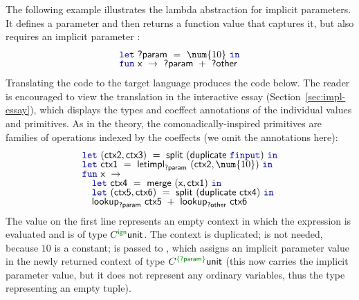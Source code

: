 The following example illustrates the lambda abstraction for implicit parameters.
It defines a parameter  and then returns a function value that captures it, but
also requires an implicit parameter :
%
\begin{equation*}
\begin{array}{l}
\kvd{let}~\ident{?param} ~=~ \num{10}~\kvd{in}\\[-0.25em]
\kvd{fun}~\ident{x}~\rightarrow~\ident{?param} ~+~ \ident{?other}
\end{array}
\end{equation*}
%
Translating the code to the target language produces the code below. The reader is encouraged to
view the translation in the interactive essay (Section~\ref{sec:impl-essay}), which displays the
types and coeffect annotations of the individual values and primitives. As in the theory, the
comonadically-inspired primitives are families of operations indexed by the coeffects (we
omit the annotations here):
%
\begin{equation*}
\begin{array}{l}
\kvd{let}~(\ident{ctx2}, \ident{ctx3}) ~=~ \ident{split}~(\ident{duplicate}~\kvd{finput})~\kvd{in}\\[-0.25em]
\kvd{let}~\ident{ctx1} ~=~ \ident{letimpl}_{\ident{?param}}~(\ident{ctx2}, \num{10})~\kvd{in}\\[-0.25em]
\kvd{fun}~\ident{x}~\rightarrow\\[-0.25em]
\quad \kvd{let}~\ident{ctx4} ~=~ \ident{merge}~(\ident{x}, \ident{ctx1})~\kvd{in}\\[-0.25em]
\quad \kvd{let}~(\ident{ctx5}, \ident{ctx6}) ~=~ \ident{split}~(\ident{duplicate}~\ident{ctx4})~\kvd{in}\\[-0.25em]
\quad \ident{lookup}_{\ident{?param}}~\ident{ctx5} ~+~ \ident{lookup}_{\ident{?other}}~\ident{ctx6}
\end{array}
\end{equation*}
%
The  value on the first line represents an empty context in which the expression is
evaluated and is of type $\ctyp{\czero}{\ident{unit}}$. The context is duplicated; 
is not needed, because $\num{10}$ is a constant;  is passed to , which
assigns an implicit parameter value in the newly returned context  of type
$\ctyp{\cclrd{\{\ident{?param}\}}}{\ident{unit}}$ (this now carries the implicit parameter value, but
it does not represent any ordinary variables, thus the  type representing an empty
tuple).

